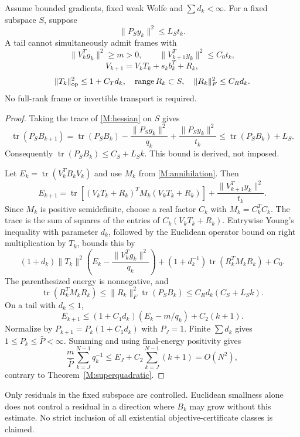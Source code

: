 \begin{theorem}\label{M:residualtheorem}
Assume bounded gradients, fixed weak Wolfe and $\sum d_k<\infty$. For a fixed subspace $S$, suppose
\[
 \|P_Sy_k\|^2\le L_St_k.
\]
A tail cannot simultaneously admit frames with
\[
 \|V_k^Tg_k\|^2\ge m>0,\qquad\|V_{k+1}^Ty_k\|^2\le C_0t_k,
\]
\[
 V_{k+1}=V_kT_k+s_kb_k^T+R_k,
\]
\[
 \|T_k\|_{\rm op}^2\le1+C_Td_k,\quad\operatorname{range}R_k\subset S,
 \quad\|R_k\|_F^2\le C_Rd_k.
\]
No full-rank frame or invertible transport is required.
\end{theorem}
\begin{proof}
Taking the trace of \eqref{M:hessian} on $S$ gives
\[
 \operatorname{tr}(P_SB_{k+1})
 =\operatorname{tr}(P_SB_k)-\frac{\|P_Sg_k\|^2}{q_k}
 +\frac{\|P_Sy_k\|^2}{t_k}
 \le\operatorname{tr}(P_SB_k)+L_S.
\]
Consequently $\operatorname{tr}(P_SB_k)\le C_S+L_Sk$. This bound is derived, not imposed.

Let $E_k=\operatorname{tr}(V_k^TB_kV_k)$ and use $M_k$ from \eqref{M:annihilation}. Then
\[
 E_{k+1}=\operatorname{tr}\!\left[(V_kT_k+R_k)^TM_k(V_kT_k+R_k)\right]
 +\frac{\|V_{k+1}^Ty_k\|^2}{t_k}.
\]
Since $M_k$ is positive semidefinite, choose a real factor $C_k$ with $M_k=C_k^TC_k$. The trace is the sum of squares of the entries of $C_k(V_kT_k+R_k)$. Entrywise Young's inequality with parameter $d_k$, followed by the Euclidean operator bound on right multiplication by $T_k$, bounds this by
\[
 (1+d_k)\|T_k\|^2\left(E_k-\frac{\|V_k^Tg_k\|^2}{q_k}\right)
 +(1+d_k^{-1})\operatorname{tr}(R_k^TM_kR_k)+C_0.
\]
The parenthesized energy is nonnegative, and
\[
 \operatorname{tr}(R_k^TM_kR_k)
 \le\|R_k\|_F^2\operatorname{tr}(P_SB_k)
 \le C_Rd_k(C_S+L_Sk).
\]
On a tail with $d_k\le1$,
\[
 E_{k+1}\le(1+C_1d_k)(E_k-m/q_k)+C_2(k+1).
\]
Normalize by $P_{k+1}=P_k(1+C_1d_k)$ with $P_J=1$. Finite $\sum d_k$ gives $1\le P_k\le\bar P<\infty$. Summing and using final-energy positivity gives
\[
 \frac m{\bar P}\sum_{k=J}^{N-1}q_k^{-1}
 \le E_J+C_2\sum_{k=J}^{N-1}(k+1)=O(N^2),
\]
contrary to Theorem~\ref{M:superquadratic}.
\end{proof}
Only residuals in the fixed subspace are controlled. Euclidean smallness alone does not control a residual in a direction where $B_k$ may grow without this estimate. No strict inclusion of all existential objective-certificate classes is claimed.
